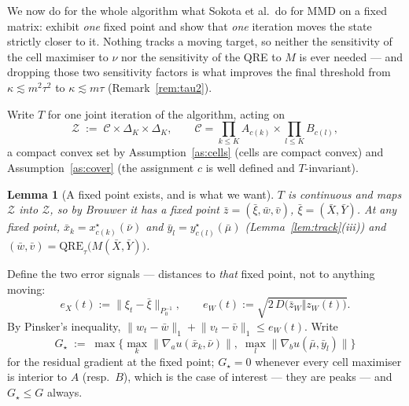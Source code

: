 \documentclass[11pt,a4paper]{article}
\theoremstyle{plain}
\newtheorem{lemma}[theorem]{Lemma}
\theoremstyle{definition}
\theoremstyle{remark}
\newcommand{\QRE}{\mathrm{QRE}}
\newcommand{\simplex}{\Delta}
\newcommand{\norm}[1]{\lVert #1 \rVert}
\begin{document}
We now do for the whole algorithm what Sokota et al.\ do for MMD on a fixed matrix:
exhibit \emph{one} fixed point and show that \emph{one} iteration moves the state
strictly closer to it. Nothing tracks a moving target, so neither the sensitivity of
the cell maximiser to $\nu$ nor the sensitivity of the QRE to $M$ is ever needed ---
and dropping those two sensitivity factors is what improves the final threshold from
$\kappa\lesssim m^2\tau^2$ to $\kappa\lesssim m\tau$ (Remark~\ref{rem:tau2}).

Write $T$ for one joint iteration of the algorithm, acting on
\[
\mathcal Z\;:=\;\mathcal C\times\simplex_K\times\simplex_K,
\qquad \mathcal C=\prod_{k\le K}A_{c(k)}\times\prod_{l\le K}B_{c(l)},
\]
a compact convex set by Assumption~\ref{as:cells} (cells are compact convex) and
Assumption~\ref{as:cover} (the assignment $c$ is well defined and $T$-invariant).

\begin{lemma}[A fixed point exists, and is what we want]\label{lem:exists}
$T$ is continuous and maps $\mathcal Z$ into $\mathcal Z$, so by Brouwer it has a fixed
point $\bar z=(\bar\xi,\bar w,\bar v)$, $\bar\xi=(\bar X,\bar Y)$. At any fixed point,
$\bar x_k=x^\star_{c(k)}(\bar\nu)$ and $\bar y_l=y^\star_{c(l)}(\bar\mu)$
(Lemma~\ref{lem:track}(iii)) and $(\bar w,\bar v)=\QRE_\tau\big(M(\bar X,\bar Y)\big)$.
\end{lemma}

\noindent Define the two error signals --- distances to \emph{that} fixed point, not to
anything moving:
\[
e_X(t):=\norm{\xi_t-\bar\xi}_{P_0^{-1}},
\qquad
e_W(t):=\sqrt{2\,D\big(\bar z_W\Vert z_W(t)\big)} .
\]
By Pinsker's inequality, $\norm{w_t-\bar w}_1+\norm{v_t-\bar v}_1\le e_W(t)$. Write
\[
G_\star\;:=\;\max\Big\{\max_k\norm{\nabla_au(\bar x_k,\bar\nu)},\;
\max_l\norm{\nabla_bu(\bar\mu,\bar y_l)}\Big\}
\]
for the residual gradient at the fixed point; $G_\star=0$ whenever every cell maximiser
is interior to $A$ (resp.\ $B$), which is the case of interest --- they are peaks --- and
$G_\star\le G$ always.
\end{document}
